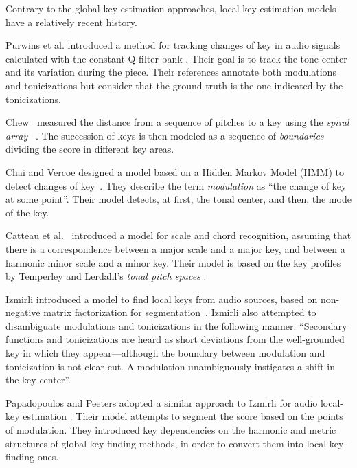 


Contrary to the global-key estimation approaches, local-key
estimation models have a relatively recent history.

Purwins et al. introduced a method for tracking changes of
key in audio signals %
calculated with the constant Q filter bank
\parencite{purwins2000new}. Their goal is to track the tone
center and its variation during the piece. Their references
annotate both modulations and tonicizations but consider
that the ground truth is the one indicated by the
tonicizations.

Chew~\parencite{chew2002key} measured the distance from a
sequence of pitches to a key using the \emph{spiral array}
~\parencite{chew2000towardsam}. The succession of keys is then
modeled as a sequence of \emph{boundaries} dividing the
score in different key areas.

Chai and Vercoe designed a model based on a Hidden Markov
Model (HMM) to detect changes of
key~\parencite{chai2005detection}. They describe the term
\emph{modulation} as ``the change of key at some point''.
Their model detects, at first, the tonal center, and then,
the mode of the key.

Catteau et al.~\parencite{catteau07tonalkey} introduced a model
for scale and chord recognition, assuming that there is a
correspondence between a major scale and a major key, and
between a harmonic minor scale and a minor key. Their model
is based on the key profiles by Temperley
\parencite{temperley99tonality} and Lerdahl's \emph{tonal pitch
spaces} \parencite{lerdahl88tps}.

Izmirli introduced a model to find local keys from audio
sources, based on non-negative matrix factorization for
segmentation~\parencite{izmirli2007localized}. Izmirli also
attempted to disambiguate modulations and tonicizations in
the following manner: ``Secondary functions and
tonicizations are heard as short deviations from the
well-grounded key in which they appear---although the
boundary between modulation and tonicization is not clear
cut. A modulation unambiguously instigates a shift in the
key center''.

Papadopoulos and Peeters adopted a similar approach to
Izmirli for audio local-key estimation
\parencite{papadopoulos2009local}. Their model attempts to
segment the score based on the points of modulation. They
introduced key dependencies on the harmonic and metric
structures of global-key-finding methods, in order to
convert them into local-key-finding ones.

